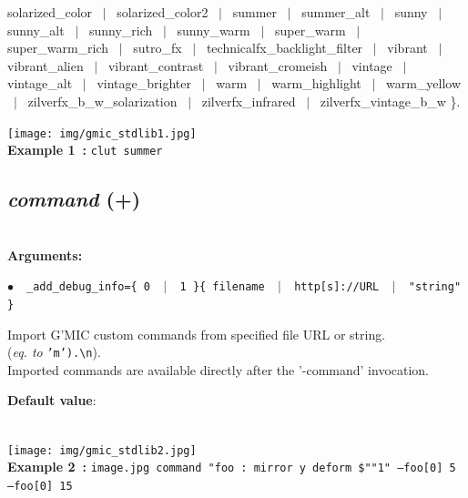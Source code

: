 \documentclass[a4paper,10.5pt,twoside]{book}
\def\comma{\discretionary{,}{}{,}}
\newcommand{\Cb}[1]{\textcolor{cb}{#1}}
\newcommand{\Cc}[1]{\textcolor{cc}{#1}}
\begin{document}
solarized\_color ~$|$~ solarized\_color2 ~$|$~ summer ~$|$~ summer\_alt ~$|$~ sunny ~$|$~ sunny\_alt ~$|$~ sunny\_rich ~$|$~ sunny\_warm ~$|$~ super\_warm ~$|$~ super\_warm\_rich ~$|$~ sutro\_fx ~$|$~ technicalfx\_backlight\_filter ~$|$~ vibrant ~$|$~ vibrant\_alien ~$|$~ vibrant\_contrast ~$|$~ vibrant\_cromeish ~$|$~ vintage ~$|$~ vintage\_alt ~$|$~ vintage\_brighter ~$|$~ warm ~$|$~ warm\_highlight ~$|$~ warm\_yellow ~$|$~ zilverfx\_b\_w\_solarization ~$|$~ zilverfx\_infrared ~$|$~ zilverfx\_vintage\_b\_w \}.
\begin{center}\texttt{[image: img/gmic\_stdlib1.jpg]}\\
{\footnotesize \textbf{Example 1~:} \texttt{clut summer}}
\end{center}

\subsection{\emph{command} (+)}\vspace*{-0.7em}
~\\\textbf{\Cb{Arguments: }}\begin{flushleft}
{\small \Cb{\hspace*{0.5cm}$\bullet$~~\texttt{\_add\_debug\_info=\{ 0 ~$|$~ 1 \}{\comma}\{ filename ~$|$~ http[s]://URL ~$|$~ "stri\-ng" \}}}}\end{flushleft}
Import G'MIC custom commands from specified file{\comma} URL or string.
~\\(\emph{eq. to} {\small \texttt{'m').\textbackslash n}}).
~\\Imported commands are available directly after the '-command' invocation.
\begin{flushleft}\Cc{\textbf{Default value}:\\~\\\hspace*{0.5cm}{\small $\bullet$~~\texttt{'add\_debug\_info=1'.}}}\end{flushleft}
\begin{center}\texttt{[image: img/gmic\_stdlib2.jpg]}\\
{\footnotesize \textbf{Example 2~:} \texttt{image.jpg command "foo : mirror y deform \$""1" --foo[0] 5 --foo[0] 15}}
\end{center}
\end{document}
